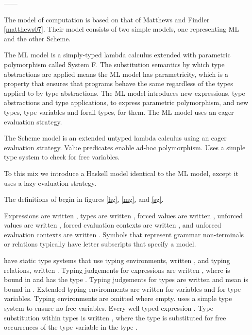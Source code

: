 ------

The model of computation is based on that of Matthews and Findler \ref{matthews07}. Their model consists of two simple models, one representing ML and the other Scheme.

The ML model is a simply-typed lambda calculus extended with parametric polymorphism called System F. The substitution semantics by which type abstractions are applied means the ML model has parametricity, which is a property that ensures that programs behave the same regardless of the types applied to by type abstractions.  The ML model introduces new expressions, type abstractions and type applications, to express parametric polymorphism, and new types, type variables and forall types, for them. The ML model uses an eager evaluation strategy.

The Scheme model is an extended untyped lambda calculus using an eager evaluation strategy. Value predicates enable ad-hoc polymorphism. Uses a simple type system to check for free variables.

To this mix we introduce a Haskell model identical to the ML model, except it uses a lazy evaluation strategy.

The definitions of \thehaskellmlscheme begin in figures \ref{hg}, \ref{mg}, and \ref{sg}.

Expressions are written \varexp, types are written \varty, forced values are written \varvalf, unforced values are written \varvalu, forced evaluation contexts are written \varconf, and unforced evaluation contexts are written \varconu. Symbols that represent grammar non-terminals or relations typically have letter subscripts that specify a model.

\Thehaskellml have static type systems that use typing environments, written \env, and typing relations, written \jud. Typing judgements for expressions are written \jude{\env}{\jud}{\varexp}{\varty}, where \varexp is bound in \env and has the type \varty. Typing judgements for types are written \judt{\env}{\jud}{\varty} and mean \varty is bound in \env. Extended typing environments are written \envexte{\env}{\varvar}{\varty} for variables and \envextt{\env}{\tyvar} for type variables. Typing environments are omitted where empty. \Thescheme uses a simple type system to ensure no free variables. Every well-typed \scheme expression \hastype{\tytst}. Type substitution within types is written , where the type  is substituted for free occurrences of the type variable  in the type .

